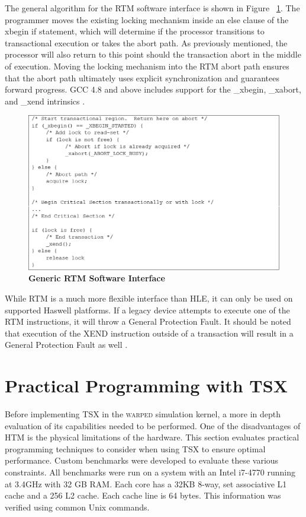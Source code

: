 \documentclass[11pt]{book}
\begin{document}
The general algorithm for the RTM software interface is shown in Figure
~\ref{fig:rtm_interface}.  The programmer moves the existing locking mechanism inside an
else clause of the xbegin if statement, which will determine if the processor transitions
to transactional execution or takes the abort path.  As previously mentioned, the
processor will also return to this point should the transaction abort in the middle of
execution. Moving the locking mechanism into the RTM abort path ensures that the abort
path ultimately uses explicit synchronization and guarantees forward progress.  GCC 4.8
and above includes support for the \_xbegin, \_xabort, and \_xend intrinsics \cite{gcc}.

\begin{figure}[H]
    \centering
    \graphicspath{ {./figures/} }
    \includegraphics[width=\textwidth,height=\textheight,keepaspectratio]{fig_rtmInterface}
    \caption{\textbf{Generic RTM Software Interface}}
    \label{fig:rtm_interface}
\end{figure}

While RTM is a much more flexible interface than HLE, it can only be used on supported
Haswell platforms.  If a legacy device attempts to execute one of the RTM instructions, it
will throw a General Protection Fault.  It should be noted that execution of the XEND
instruction outside of a transaction will result in a General Protection Fault as well
\cite{intel_opt_man}.

\chapter{Practical Programming with TSX}

Before implementing TSX in the \textsc{warped} simulation kernel, a more in depth
evaluation of its capabilities needed to be performed.  One of the disadvantages
of HTM is the physical limitations of the hardware.  This section evaluates
practical programming techniques to consider when using TSX to ensure optimal
performance.  Custom benchmarks were developed to evaluate these various
constraints.  All benchmarks were run on a system with an Intel i7-4770 running
at 3.4GHz with 32 GB RAM.  Each core has a 32KB 8-way, set associative L1 cache
and a 256 L2 cache.  Each cache line is 64 bytes.  This information was verified
using common Unix commands.
\end{document}
